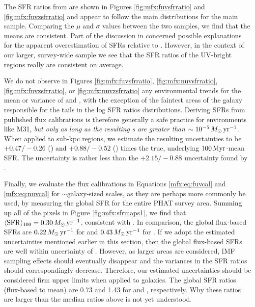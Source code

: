 \documentclass[iop, tighten]{emulateapj}
\begin{document}
The \fuv{} SFR ratios from \citet{Simones:2014} are shown in Figures
\ref{fig:mfx:fuvsfrratio} and \ref{fig:mfx:fuvzsfrratio} and appear to follow
the main distributions for the main sample. Comparing the $\mu$ and $\sigma$
values between the two samples, we find that the means are consistent. Part of
the discussion in \citet{Simones:2014} concerned possible explanations for the
apparent overestimation of SFRs relative to \sfroneh{}. However, in the context
of our larger, survey-wide sample we see that the SFR ratios of the UV-bright
regions really are consistent on average.

We do not observe in Figures \ref{fig:mfx:fuvsfrratio},
\ref{fig:mfx:nuvsfrratio}, \ref{fig:mfx:fuvzsfrratio}, or
\ref{fig:mfx:nuvzsfrratio} any environmental trends for the mean or variance of
\sfrx{} and \sfrxz{}, with the exception of the faintest areas of the galaxy
responsible for the tails in the log SFR ratios distributions. Deriving SFRs
from published flux calibrations is therefore generally a safe practice for
environments like M31, \emph{but only as long as the resulting \sfr{}s are
greater than $\sim 10^{-5}\,M_\odot\,\mathrm{yr}^{-1}$}. When applied to sub-kpc regions, we
estimate the resulting uncertainties to be $+\!0.47/\!-\!0.26$ (\fuv{}) and
$+\!0.88/\!-\!0.52$ (\nuv{}) times the true, underlying $100\,\mathrm{Myr}$-mean SFR. The
\sfrfuv{} uncertainty is rather less than the $+\!2.15/\!-\!0.88$ uncertainty
found by \citet{Simones:2014}.

Finally, we evaluate the flux calibrations in Equations \ref{mfx:eq:fuvcal} and
\ref{mfx:eq:nuvcal} for $\sim$galaxy-sized scales, as they are perhaps more
commonly be used, by measuring the global SFR for the entire PHAT survey area.
Summing up all of the pixels in Figure \ref{fig:mfx:sfrmaps1}, we find that
$\langle\mathrm{SFR}\rangle_{100}=0.30\,M_\odot\,\mathrm{yr}^{-1}$, consistent with \citet{Lewis:2014}. In
comparison, the global flux-based SFRs are $0.22\,M_\odot\,\mathrm{yr}^{-1}$ for \fuv{} and
$0.43\,M_\odot\,\mathrm{yr}^{-1}$ for \nuv{}. If we adopt the estimated uncertainties
mentioned earlier in this section, then the global flux-based SFRs are well
within uncertainty of \sfroneh{}. However, as larger areas are considered, IMF
sampling effects should eventually disappear and the variances in the SFR
ratios should correspondingly decrease. Therefore, our estimated uncertainties
should be considered firm upper limits when applied to galaxies. The global SFR
ratios (flux-based to mean) are 0.73 and 1.43 for \fuv{} and \nuv{},
respectively. Why these ratios are larger than the median ratios above is not
yet understood.
\end{document}

